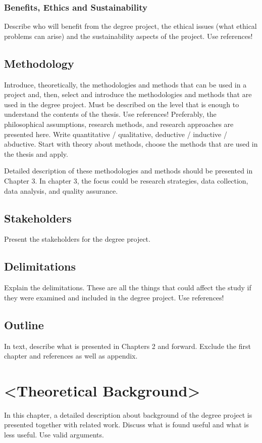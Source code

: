 \subsubsection{Benefits, Ethics and Sustainability}
Describe who will benefit from the degree project, the ethical issues (what ethical problems can arise) and the sustainability aspects of the project.
Use references!

\subsection{Methodology}
Introduce, theoretically, the methodologies and methods that can be used in a project and, then, select and introduce the methodologies and methods that are used in the degree project. Must be described on the level that is enough to understand the contents of the thesis. 
Use references!
Preferably, the philosophical assumptions, research methods, and research approaches are presented here. Write quantitative / qualitative, deductive / inductive / abductive. Start with theory about methods, choose the methods that are used in the thesis and apply. 


Detailed description of these methodologies and methods should be presented in Chapter 3. In chapter 3, the focus could be research strategies, data collection, data analysis, and quality assurance.


\subsection{Stakeholders}
Present the stakeholders for the degree project.

\subsection{Delimitations}
Explain the delimitations. These are all the things that could affect the study if they were examined and included in the degree project. 
Use references!

\subsection{Outline}
In text, describe what is presented in Chapters 2 and forward. Exclude the first chapter and references as well as appendix. 


\newpage   


\section{<Theoretical Background>}
In this chapter, a detailed description about background of the degree project is presented together with related work. Discuss what is found useful and what is less useful. Use valid arguments. 


